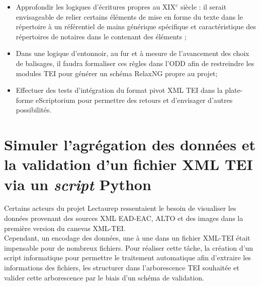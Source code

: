 \begin{itemize}
    Par exemple, une colonne correspond au type d'acte, la suivante au prix, la suivante au client etc.; et dans un deuxième temps, il faudrait réunir les blocs horizontaux similaires si ces blocs concernent un même acte. Le dernier point ne constitue pas une tâche évidente dans la mesure où les répertoires de notaires présentent des écritures pouvant parfois déborder des colonnes ou prendre de la place sur plusieurs lignes. Toujours est-il que des outils existent comme Grobid\footnote{Grobid documentation, URL: \url{https://grobid.readthedocs.io/en/latest/Introduction/}} (\textit{GeneRation Of BIbliographic Data}), toujours en développement, pour extraire des informations sur la structure d'un document, parser et restructurer ces informations dans un format XML-TEI;\\
    \item Approfondir les logiques d'écritures propres au XIX$^e$ siècle : il serait envisageable de relier certains éléments de mise en forme du texte dans le répertoire à un référentiel de mains générique spécifique et caractéristique des répertoires de notaires dans le  contenant des éléments ;\\
    \item Dans une logique d'entonnoir, au fur et à mesure de l'avancement des choix de balisages, il faudra formaliser ces règles dans l'ODD afin de restreindre les modules TEI pour générer un schéma RelaxNG propre au projet;\\
    \item Effectuer des tests d'intégration du format pivot XML TEI dans la plate-forme eScriptorium pour permettre des retours et d'envisager d'autres possibilités. 
\end{itemize}
\newpage
\section{Simuler l'agrégation des données et la validation d'un fichier XML TEI via un \textit{script} Python}\label{generator-lecto-dev}

Certains acteurs du projet Lectaurep ressentaient le besoin de visualiser les données provenant des sources XML EAD-EAC, ALTO et des images dans la première version du canevas XML-TEI.\\

Cependant, un encodage  des données, une à une dans un fichier XML-TEI était impensable pour de nombreux fichiers. Pour réaliser cette tâche, la création d'un script informatique pour permettre le traitement automatique afin d'extraire les informations des fichiers, les structurer dans l'arborescence TEI souhaitée et valider cette arborescence par le biais d'un schéma de validation.\\

